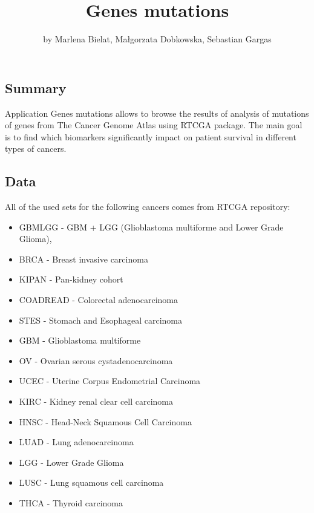 \title{Genes mutations}
\author{by Marlena Bielat, Małgorzata Dobkowska, Sebastian Gargas}

\maketitle


\subsection{Summary}\label{summary}

Application Genes mutations allows to browse the results of analysis of
mutations of genes from The Cancer Genome Atlas using RTCGA package. The
main goal is to find which biomarkers significantly impact on patient
survival in different types of cancers.

\subsection{Data}\label{data}

All of the used sets for the following cancers comes from RTCGA
repository:

\begin{itemize}
\itemsep1pt\parskip0pt
\item
  GBMLGG - GBM + LGG (Glioblastoma multiforme and Lower Grade Glioma),
\item
  BRCA - Breast invasive carcinoma
\item
  KIPAN - Pan-kidney cohort
\item
  COADREAD - Colorectal adenocarcinoma
\item
  STES - Stomach and Esophageal carcinoma
\item
  GBM - Glioblastoma multiforme
\item
  OV - Ovarian serous cystadenocarcinoma
\item
  UCEC - Uterine Corpus Endometrial Carcinoma
\item
  KIRC - Kidney renal clear cell carcinoma
\item
  HNSC - Head-Neck Squamous Cell Carcinoma
\item
  LUAD - Lung adenocarcinoma
\item
  LGG - Lower Grade Glioma
\item
  LUSC - Lung squamous cell carcinoma
\item
  THCA - Thyroid carcinoma
\end{itemize}

